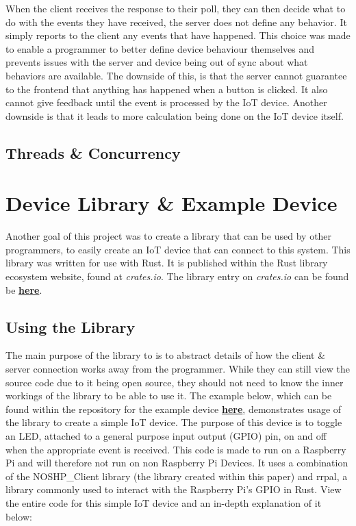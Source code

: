 When the client receives the response to their poll, they can then decide what to do with the events they have received, the server does not define any behavior. It simply reports to the client any events that have happened. This choice was made to enable a programmer to better define device behaviour themselves and prevents issues with the server and device being out of sync about what behaviors are available. The downside of this, is that the server cannot guarantee to the frontend that anything has happened when a button is clicked. It also cannot give feedback until the event is processed by the IoT device. Another downside is that it leads to more calculation being done on the IoT device itself.


\subsection{Threads \& Concurrency} \label{sec:chapimpl:server:threads}

\section{Device Library \& Example Device} \label{sec:chapimpl:devicelib}
Another goal of this project was to create a library that can be used by other programmers, to easily create an IoT device that can connect to this system. This library was written for use with Rust. It is published within the Rust library ecosystem website, found at \textit{crates.io}. The library entry on \textit{crates.io} can be found be \textbf{\href{https://crates.io/crates/NOSHP-Client}{here}}. 

\subsection{Using the Library}
The main purpose of the library to is to abstract details of how the client \& server connection works away from the programmer. While they can still view the source code due to it being open source, they should not need to know the inner workings of the library to be able to use it. The example below, which can be found within the repository for the example device \textbf{\href{https://github.com/niknik3610/Example-Iot-Device}{here}}, demonstrates usage of the library to create a simple IoT device. The purpose of this device is to toggle an LED, attached to a general purpose input output (GPIO) pin, on and off when the appropriate event is received. This code is made to run on a Raspberry Pi and will therefore not run on non Raspberry Pi Devices. It uses a combination of the NOSHP\_Client library (the library created within this paper) and rrpal, a library commonly used to interact with the Raspberry Pi's GPIO in Rust. View the entire code for this simple IoT device and an in-depth explanation of it below: 


